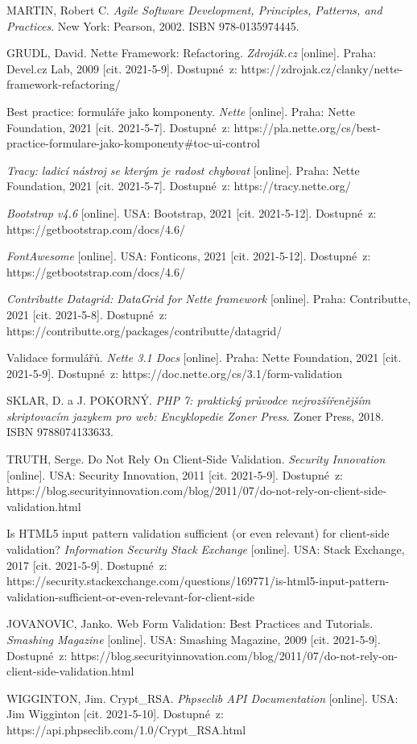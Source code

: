 MARTIN, Robert C. \textit{Agile Software Development, Principles, Patterns, and Practices}. New York: Pearson, 2002. ISBN 978-0135974445.

GRUDL, David. Nette Framework: Refactoring. \textit{Zdroják.cz} [online]. Praha: Devel.cz Lab, 2009 [cit. 2021-5-9]. Dostupné~z: https://zdrojak.cz/clanky/nette-framework-refactoring/

Best practice: formuláře jako komponenty. \textit{Nette} [online]. Praha: Nette Foundation, 2021 [cit. 2021-5-7]. Dostupné~z: https://pla.nette.org/cs/best-practice-formulare-jako-komponenty\#toc-ui-control

\textit{Tracy: ladicí nástroj se kterým je radost chybovat} [online]. Praha: Nette Foundation, 2021 [cit. 2021-5-7]. Dostupné~z: https://tracy.nette.org/

\textit{Bootstrap v4.6} [online]. USA: Bootstrap, 2021 [cit. 2021-5-12]. Dostupné~z: https://getbootstrap.com/docs/4.6/

\textit{FontAwesome} [online]. USA: Fonticons, 2021 [cit. 2021-5-12]. Dostupné~z: https://getbootstrap.com/docs/4.6/

\textit{Contributte Datagrid: DataGrid for Nette framework} [online]. Praha: Contributte, 2021 [cit. 2021-5-8]. Dostupné~z: https://contributte.org/packages/contributte/datagrid/

Validace formulářů. \textit{Nette 3.1 Docs} [online]. Praha: Nette Foundation, 2021 [cit. 2021-5-9]. Dostupné~z: https://doc.nette.org/cs/3.1/form-validation

SKLAR, D. a J. POKORNÝ. \textit{PHP 7: praktický průvodce nejrozšířenějším skriptovacím jazykem pro web: Encyklopedie Zoner Press}. Zoner Press, 2018. ISBN 9788074133633.

TRUTH, Serge. Do Not Rely On Client-Side Validation. \textit{Security Innovation} [online]. USA: Security Innovation, 2011 [cit. 2021-5-9]. Dostupné~z: https://blog.securityinnovation.com/blog/2011/07/do-not-rely-on-client-side-validation.html

Is HTML5 input pattern validation sufficient (or even relevant) for client-side validation? \textit{Information Security Stack Exchange} [online]. USA: Stack Exchange, 2017 [cit. 2021-5-9]. Dostupné~z: https://security.stackexchange.com/questions/169771/is-html5-input-pattern-validation-sufficient-or-even-relevant-for-client-side

JOVANOVIC, Janko. Web Form Validation: Best Practices and Tutorials. \textit{Smashing Magazine} [online]. USA: Smashing Magazine, 2009 [cit. 2021-5-9]. Dostupné~z: https://blog.securityinnovation.com/blog/2011/07/do-not-rely-on-client-side-validation.html

WIGGINTON, Jim. Crypt\_RSA. \textit{Phpseclib API Documentation} [online]. USA: Jim Wigginton [cit. 2021-5-10]. Dostupné~z: https://api.phpseclib.com/1.0/Crypt\_RSA.html

